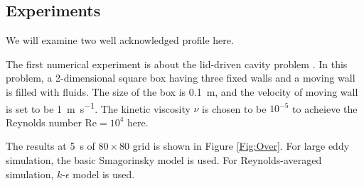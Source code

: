 \documentclass[english, nochinese]{pkupaper}
\begin{document}
\subsection{Experiments}

We will examine two well acknowledged profile here.

The first numerical experiment is about the lid-driven cavity problem \parencite{bruneau_2d_2006}. In this problem, a 2-dimensional square box having three fixed walls and a moving wall is filled with fluids. The size of the box is \SI{0.1}{\meter}, and the velocity of moving wall is set to be \SI{1}{\meter\per\second}. The kinetic viscosity $\nu$ is chosen to be $10^{-5}$\Si{\meter\squared\per\second} to acheieve the Reynolds number $ \mathrm{Re} = 10^4 $ here.

The results at \SI{5}{s} of $ 80 \times 80 $ grid is shown in Figure \ref{Fig:Over}. For large eddy simulation, the basic Smagorinsky model is used. For Reynolds-averaged simulation, $k$-$\epsilon$ model is used.
\end{document}
